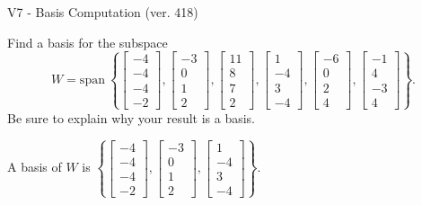 \begin{exercise}
  \begin{exerciseTitle}V7 - Basis Computation (ver. 418)\end{exerciseTitle}
  \begin{exerciseStatement}
    Find a basis for the subspace 
\[W=\mathrm{span}\ \left\{\left[\begin{array}{r}
-4 \\
-4 \\
-4 \\
-2
\end{array}\right] , \left[\begin{array}{r}
-3 \\
0 \\
1 \\
2
\end{array}\right] , \left[\begin{array}{r}
11 \\
8 \\
7 \\
2
\end{array}\right] , \left[\begin{array}{r}
1 \\
-4 \\
3 \\
-4
\end{array}\right] , \left[\begin{array}{r}
-6 \\
0 \\
2 \\
4
\end{array}\right] , \left[\begin{array}{r}
-1 \\
4 \\
-3 \\
4
\end{array}\right]\right\}.\]
 Be sure to explain why your result is a basis.


  \end{exerciseStatement}
  \begin{exerciseAnswer}
   A basis of \(W\) is  \(\left\{\left[\begin{array}{r}
-4 \\
-4 \\
-4 \\
-2
\end{array}\right] , \left[\begin{array}{r}
-3 \\
0 \\
1 \\
2
\end{array}\right] , \left[\begin{array}{r}
1 \\
-4 \\
3 \\
-4
\end{array}\right]\right\}\).
  


  \end{exerciseAnswer}
\end{exercise}
